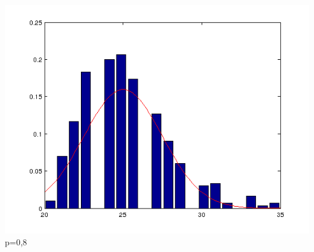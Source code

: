 \documentclass{article}
\begin{document}
\begin{center}
	\includegraphics[scale=0.5]{graph/n20p8.png} \\
	p=0,8
\end{center}
\end{document}
